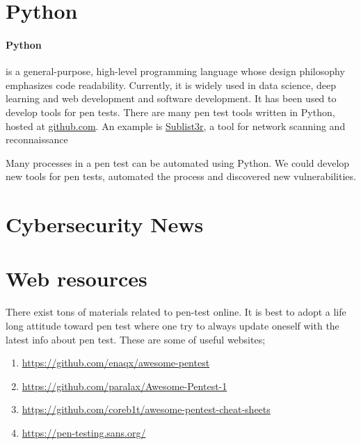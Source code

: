 \documentclass[7x9]{times}
\begin{document}

\section{Python}

\paragraph{Python}\cite{van2007python,lutz2013learning,lutz2010programming}
is a general-purpose, high-level programming language whose design
philosophy emphasizes code readability. Currently, it is widely used
in data science, deep learning and web development and software
development. It has been used to develop tools for pen tests.  There
are many pen test tools written in Python, hosted at
\url{github.com}. An example is \url{Sublist3r}, a tool for network
scanning and reconnaissance 


Many processes in a pen test can be automated using Python. We could develop 
new tools for pen tests, automated the
process and discovered new vulnerabilities.


%

\section{Cybersecurity News}

\section{Web resources}

There exist tons of materials related to pen-test online. It is best to adopt
a life long attitude toward pen test where one try to always update oneself
with the latest info about pen test. These are some of useful websites;
\begin{enumerate}
\item \url{https://github.com/enaqx/awesome-pentest}
\item \url{https://github.com/paralax/Awesome-Pentest-1}
\item \url{https://github.com/coreb1t/awesome-pentest-cheat-sheets}
\item \url{https://pen-testing.sans.org/}
\end{enumerate}
\end{document}
